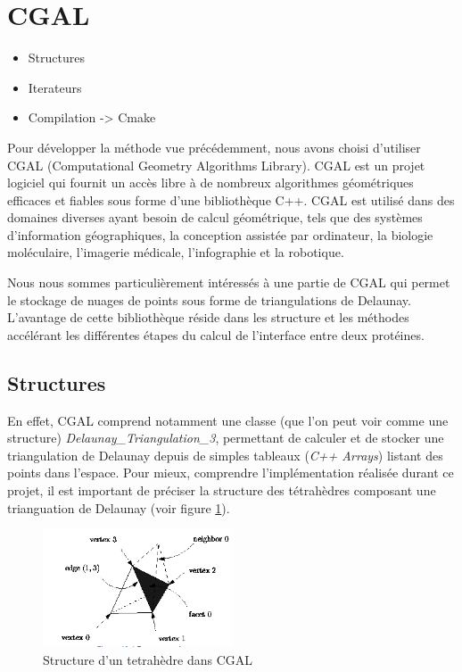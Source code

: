 \section{CGAL}
\begin{itemize}
  \item Structures
  \item Iterateurs
  \item Compilation -> Cmake
\end{itemize}

Pour développer la méthode vue précédemment, nous avons choisi d'utiliser CGAL
(Computational Geometry Algorithms Library).
CGAL est un projet logiciel qui fournit un accès libre à de nombreux algorithmes géométriques
efficaces et fiables sous forme d'une bibliothèque C++. CGAL est utilisé dans des
domaines diverses ayant besoin de calcul géométrique, tels que des systèmes
d'information géographiques, la conception assistée par ordinateur, la biologie
moléculaire, l'imagerie médicale, l'infographie et la robotique.

Nous nous sommes particulièrement intéressés à une partie de CGAL qui permet le
stockage de nuages de points sous forme de triangulations de Delaunay. L'avantage
de cette bibliothèque réside dans les structure et les méthodes accélérant les différentes
étapes du calcul de l'interface entre deux protéines.

\subsection*{Structures}


En effet, CGAL comprend notamment une classe (que l'on peut voir comme une structure)
\textit{Delaunay\_Triangulation\_3},
permettant de calculer et de stocker une triangulation de Delaunay depuis de simples
tableaux (\textit{C++ Arrays}) listant des points dans l'espace. Pour mieux, comprendre
l'implémentation réalisée durant ce projet, il est important de préciser la structure des tétrahèdres
composant une trianguation de Delaunay (voir figure \ref{fig::tetrahedron_cgal}).

\begin{figure}[ht]
\centering
  \includegraphics[width=0.5\textwidth]{figures/tetrahedron_cgal.png}
  \caption{Structure d'un tetrahèdre dans CGAL}
  \label{fig::tetrahedron_cgal}
\end{figure}

